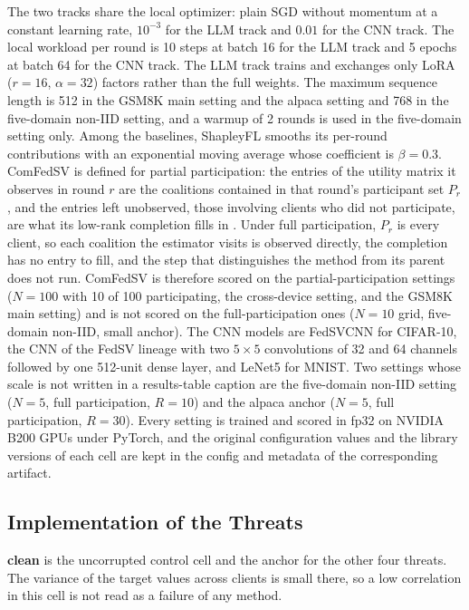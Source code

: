 \documentclass[letterpaper]{article} %
\theoremstyle{plain}
\begin{document}
The two tracks share the local optimizer: plain SGD without momentum at a
constant learning rate, $10^{-3}$ for the LLM track and $0.01$ for the CNN
track. The local workload per round is 10 steps at batch 16 for the LLM track
and 5 epochs at batch 64 for the CNN track. The LLM track trains and
exchanges only LoRA ($r{=}16$, $\alpha{=}32$) factors rather than the full
weights. The maximum sequence length is 512 in the GSM8K main setting and the
alpaca setting and 768 in the five-domain non-IID setting, and a warmup of 2
rounds is used in the five-domain setting only. Among the baselines,
ShapleyFL smooths its per-round contributions with an exponential moving
average whose coefficient is $\beta{=}0.3$. ComFedSV is defined for partial
participation: the entries of the utility matrix it observes in round $r$ are
the coalitions contained in that round's participant set $P_r$, and the
entries left unobserved, those involving clients who did not participate, are
what its low-rank completion fills in
\citep{fan2022improving}. Under full participation, $P_r$ is
every client, so each coalition the estimator visits is observed directly,
the completion has no entry to fill, and the step that distinguishes the
method from its parent does not run. ComFedSV is therefore scored on the
partial-participation settings ($N{=}100$ with 10 of 100 participating, the
cross-device setting, and the GSM8K main setting) and is not scored on the
full-participation ones ($N{=}10$ grid, five-domain non-IID, small anchor).
The CNN models are FedSVCNN
for CIFAR-10, the CNN of the FedSV lineage with two $5{\times}5$
convolutions of 32 and 64 channels followed by one 512-unit dense layer,
and LeNet5 for MNIST. Two settings whose scale is not written in
a results-table caption are the five-domain non-IID setting ($N{=}5$, full
participation, $R{=}10$) and the alpaca anchor ($N{=}5$, full participation,
$R{=}30$). Every setting is trained and scored in fp32 on NVIDIA B200 GPUs
under PyTorch, and the original configuration values and the library
versions of each cell are kept in the config and metadata of the
corresponding artifact.

\subsection{Implementation of the Threats}
\label{app:threats}

\textbf{clean} is the uncorrupted control cell and the anchor for the other
four threats. The variance of the target values across clients is small
there, so a low correlation in this cell is not read as a failure of any
method.
\end{document}
